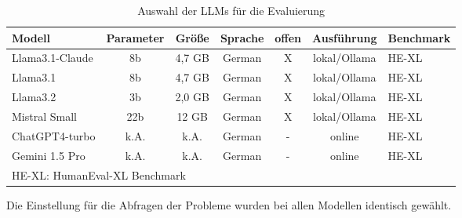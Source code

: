 \begin{table}[!ht]
	\begin{tabular}{|l|c|c|c|c|c|l|}
		\hline
		\textbf{Modell} & \textbf{Parameter} & \textbf{Größe} & \textbf{Sprache} & \textbf{offen} & \textbf{Ausführung}  & \textbf{Benchmark} \\
		\hline
		Llama3.1-Claude   &   8b & 4,7 GB & German & X & lokal/Ollama  & HE-XL \\
		Llama3.1          &   8b & 4,7 GB & German & X & lokal/Ollama  & HE-XL \\
		Llama3.2          &   3b & 2,0 GB & German & X & lokal/Ollama  & HE-XL \\
		Mistral Small     &  22b &  12 GB & German & X & lokal/Ollama & HE-XL \\
		ChatGPT4-turbo    & k.A. &   k.A. & German & - & online & HE-XL \\
		Gemini 1.5 Pro    & k.A. &   k.A. & German & - & online & HE-XL \\
		\hline
		\multicolumn{7}{|l|}{HE-XL: HumanEval-XL Benchmark} \\
		\hline
	\end{tabular}
	\caption{Auswahl der LLMs für die Evaluierung}
	\label{tab:selected_llms}
\end{table}

Die Einstellung für die Abfragen der Probleme wurden bei allen Modellen identisch gewählt.\vspace{0.2cm}

